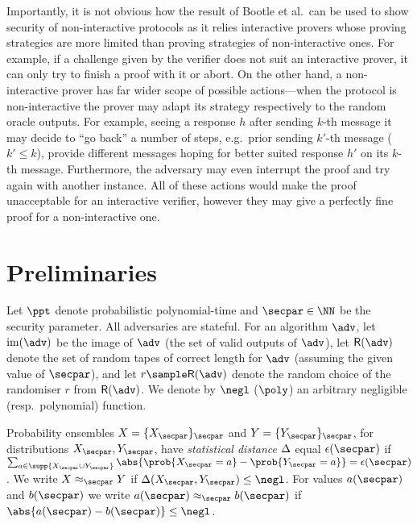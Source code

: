 \documentclass[runningheads,11pt]{llncs}
\theoremstyle{definition} \newtheorem{definition}[theorem]{Definition}
\begin{document}
Importantly, it is not obvious how the result of Bootle et al.~can be used to
show security of non-interactive protocols as it relies interactive provers
whose proving strategies are more limited than proving strategies of
non-interactive ones. For example, if a challenge given by the verifier does not
suit an interactive prover, it can only try to finish a proof with it or
abort. On the other hand, a non-interactive prover has far wider scope of
possible actions---when the protocol is non-interactive the prover may
adapt its strategy respectively to the random oracle outputs. For example,
seeing a response $h$ after sending $k$-th message it may decide to ``go back''
a number of steps, e.g.~prior sending $k'$-th message ($k' \leq k$), provide
different messages hoping for better suited response $h'$ on its $k$-th
message. Furthermore, the adversary may even interrupt the proof and try again
with another instance. All of these actions would make the proof unacceptable
for an interactive verifier, however they may give a perfectly fine proof for a
non-interactive one.

\section{Preliminaries}
\label{sec:preliminaries}
Let $\ppt$ denote probabilistic polynomial-time and $\secpar \in \NN$ be the
security parameter. All adversaries are stateful. For an algorithm $\adv$, let
$\image (\adv)$ be the image of $\adv$ (the set of valid outputs of $\adv$), let
$\RND{\adv}$ denote the set of random tapes of correct length for $\adv$
(assuming the given value of $\secpar$), and let $r \sample \RND{\adv}$ denote
the random choice of the randomiser $r$ from $\RND{\adv}$. We denote by $\negl$
($\poly$) an arbitrary negligible (resp.~polynomial) function.

Probability ensembles $X = \smallset{X_\secpar}_\secpar$ and $Y =
\smallset{Y_\secpar}_\secpar$, for distributions $X_\secpar, Y_\secpar$, have
\emph{statistical distance} $\Delta$ equal $\epsilon(\secpar)$ if $\sum_{a \in
  \supp{X_\secpar \cup Y_\secpar}} \abs{\prob{X_\secpar = a} - \prob{Y_\secpar =
    a}} = \epsilon(\secpar)$. We write $X \approx_\secpar Y$ if $\SD(X_\secpar,
Y_\secpar) \leq \negl$. For values $a(\secpar)$ and $b(\secpar)$ we write
$a(\secpar) \approx_\secpar b(\secpar)$ if $\abs{a(\secpar) - b(\secpar)} \leq
\negl$.

\newcommand{\samplespace}{\Omega}
\newcommand{\eventspace}{\mathcal{F}}
\newcommand{\probfunction}{\mu}
\end{document}
